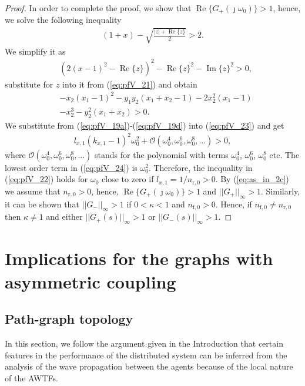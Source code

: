 \documentclass[10pt,twocolumn,twoside]{IEEEtran}
\theoremstyle{definition}
\begin{document}
\begin{proof}
In order to complete the proof, we show that $\operatorname{Re}\{G_+(\jmath\omega_0)\} > 1$, hence, we solve the following inequality
\begin{align}
  \left(1+x\right)
    -\sqrt{\frac{|z|+\operatorname{Re}\{z\}}{2}} > 2.\label{eq:pfV_22}
\end{align}
We simplify it as
\begin{align}
 & \left(2 (x-1)^2 - \operatorname{Re}\{z\} \right)^2 - \operatorname{Re}\{z\}^2 - \operatorname{Im}\{z\}^2 > 0,
\end{align}
substitute for $z$ into it from (\ref{eq:pfV_21}) and obtain
\begin{align}
 & - x_2(x_1-1)^2 - y_1 y_2(x_1+x_2-1) -2x_2^2 (x_1-1)  \nonumber \\
 & - x_2^3 - y_2^2(x_1+x_2) > 0. \label{eq:pfV_23}
\end{align}
We substitute from (\ref{eq:pfV_19a})-(\ref{eq:pfV_19d}) into (\ref{eq:pfV_23}) and get
\begin{align}
  l_{x,1} (k_{x,1}-1)^2 \omega_0^2 + \mathcal{O}(\omega_0^4, \omega_0^6, \omega_0^8, ...) > 0,\label{eq:pfV_24}
\end{align}
where $\mathcal{O}(\omega_0^4, \omega_0^6, \omega_0^8, ...)$ stands for the polynomial with terms $\omega_0^4$, $\omega_0^6$, $\omega_0^8$ etc. The lowest order term in (\ref{eq:pfV_24}) is $\omega_0^2$. Therefore, the inequality in (\ref{eq:pfV_22}) holds for $\omega_0$ close to zero if $l_{x,1} = 1/n_{\text{r},0}> 0$. By (\ref{eq:as_in_2c}) we assume that $n_{\text{r},0} > 0$, hence, $\operatorname{Re}\{G_+(\jmath\omega_0)\}>1$ and $||G_+||_{\infty}>1$. Similarly, it can be shown that $||G_-||_{\infty}>1$ if $0< \kappa <1$ and $n_{\text{f},0} > 0$. Hence, if $n_{\text{f},0} \neq n_{\text{r},0}$ then $\kappa \neq 1$ and either $||G_+(s)||_{\infty} > 1$ or $||G_-(s)||_{\infty} > 1$.
\end{proof}


\section{Implications for the graphs with asymmetric coupling}
\subsection{Path-graph topology}


In this section, we follow the argument given in the Introduction that certain features in the performance of the distributed system can be inferred from the analysis of the wave propagation between the agents because of the local nature of the AWTFs.
\end{document}
